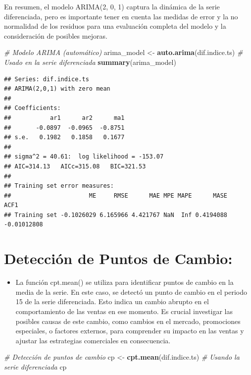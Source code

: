 \documentclass[
]{book}
\newenvironment{Shaded}{\begin{snugshade}}{\end{snugshade}}
\newcommand{\CommentTok}[1]{\textcolor[rgb]{0.56,0.35,0.01}{\textit{#1}}}
\newcommand{\FunctionTok}[1]{\textcolor[rgb]{0.13,0.29,0.53}{\textbf{#1}}}
\newcommand{\NormalTok}[1]{#1}
\newcommand{\OtherTok}[1]{\textcolor[rgb]{0.56,0.35,0.01}{#1}}
\providecommand{\tightlist}{%
  \setlength{\itemsep}{0pt}\setlength{\parskip}{0pt}}
\begin{document}
En resumen, el modelo ARIMA(2, 0, 1) captura la dinámica de la serie diferenciada, pero es importante tener en cuenta las medidas de error y la no normalidad de los residuos para una evaluación completa del modelo y la consideración de posibles mejoras.

\begin{Shaded}
\begin{Highlighting}[]
\CommentTok{\# Modelo ARIMA (automático)}
\NormalTok{arima\_model }\OtherTok{\textless{}{-}} \FunctionTok{auto.arima}\NormalTok{(dif.indice.ts) }\CommentTok{\# Usado en la serie diferenciada}
\FunctionTok{summary}\NormalTok{(arima\_model)}
\end{Highlighting}
\end{Shaded}

\begin{verbatim}
## Series: dif.indice.ts 
## ARIMA(2,0,1) with zero mean 
## 
## Coefficients:
##           ar1      ar2      ma1
##       -0.0897  -0.0965  -0.8751
## s.e.   0.1982   0.1858   0.1677
## 
## sigma^2 = 40.61:  log likelihood = -153.07
## AIC=314.13   AICc=315.08   BIC=321.53
## 
## Training set error measures:
##                      ME     RMSE      MAE MPE MAPE      MASE        ACF1
## Training set -0.1026029 6.165966 4.421767 NaN  Inf 0.4194088 -0.01012808
\end{verbatim}

\section{Detección de Puntos de Cambio:}\label{detecciuxf3n-de-puntos-de-cambio}

\begin{itemize}
\tightlist
\item
  La función cpt.mean() se utiliza para identificar puntos de cambio en la media de la serie. En este caso, se detectó un punto de cambio en el periodo 15 de la serie diferenciada. Esto indica un cambio abrupto en el comportamiento de las ventas en ese momento. Es crucial investigar las posibles causas de este cambio, como cambios en el mercado, promociones especiales, o factores externos, para comprender su impacto en las ventas y ajustar las estrategias comerciales en consecuencia.
\end{itemize}

\begin{Shaded}
\begin{Highlighting}[]
\CommentTok{\# Detección de puntos de cambio}
\NormalTok{cp }\OtherTok{\textless{}{-}} \FunctionTok{cpt.mean}\NormalTok{(dif.indice.ts) }\CommentTok{\# Usando la serie diferenciada}
\NormalTok{cp}
\end{Highlighting}
\end{Shaded}
\end{document}
